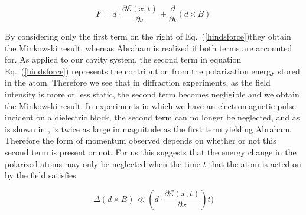 \documentclass[twocolumn,english,pra,aps,superscriptaddress,floatfix]{revtex4-1}
\begin{document}
\begin{equation}
F=d \cdot \frac{\partial\mathcal{E}(x,t)}{\partial x} + \frac{\partial}{\partial t}\left(d \times B \right)
\label{hindsforce}
\end{equation}

By considering only the first term on the right of Eq.\ (\ref{hindsforce})they obtain the Minkowski result, whereas Abraham is realized if both terms are accounted for. As applied to our cavity system, the second term in equation Eq.\ (\ref{hindsforce}) represents the contribution from the polarization energy stored in the atom. Therefore we see that in diffraction experiments, as the field intensity is more or less static, the second term becomes negligible and we obtain the Minkowski result.  In experiments in which we have an electromagnetic pulse incident on a dielectric block, the second term can no longer be neglected, and as is shown in \cite{Hinds}, is twice as large in magnitude as the first term yielding Abraham.  Therefore the form of momentum observed depends on whether or not this second term is present or not.  For us this suggests that the energy change in the polarized atoms may only be neglected when the time $t$ that the atom is acted on by the field satisfies


\begin{equation}
\Delta \left(d \times B \right) \ll  \left(d \cdot \frac{\partial\mathcal{E}(x,t)}{\partial x}\right)t)
\label{timecompare}
\end{equation}




\end{document}
